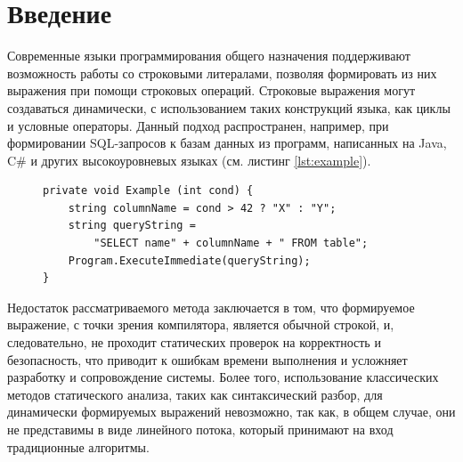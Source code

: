 \documentclass[14pt]{matmex-diploma-custom}
\begin{document}


\maketitle
\tableofcontents
\section*{Введение}
Современные языки программирования общего назначения поддерживают возможность работы со строковыми литералами,  позволяя формировать из них выражения при помощи строковых операций. Строковые выражения могут создаваться динамически, с использованием таких конструкций языка, как циклы и условные операторы. Данный подход распространен, например, при формировании SQL-запросов к базам данных из программ, написанных на Java, C$\#$ и других высокоуровневых языках (см. листинг \ref{lst:example}).

\begin{figure}[h!]	
	\lstset{language=[Sharp]C,
		showstringspaces=false,
		basicstyle=\small,
		keywordstyle=\bfseries,,	
	}
	\begin{lstlisting}[caption={Динамически формируемый SQL-запрос}, label={lst:example}, captionpos=b]
private void Example (int cond) {
    string columnName = cond > 42 ? "X" : "Y";
    string queryString = 
        "SELECT name" + columnName + " FROM table";
    Program.ExecuteImmediate(queryString);
}
	\end{lstlisting}
\end{figure}

Недостаток рассматриваемого метода заключается в том, что формируемое выражение, с точки зрения компилятора, является обычной строкой, и, следовательно, не проходит статических проверок на корректность и безопасность, что приводит к ошибкам времени выполнения и усложняет разработку и сопровождение системы. Более того, использование классических методов статического анализа, таких как синтаксический разбор, для динамически формируемых выражений невозможно, так как, в общем случае, они не представимы в виде линейного потока, который принимают на вход традиционные алгоритмы.
\end{document}
